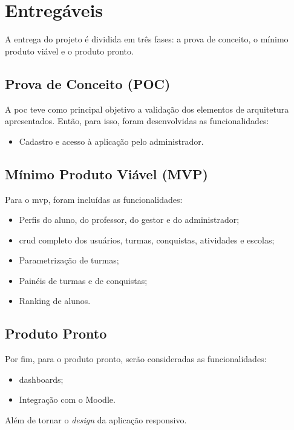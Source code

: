 \section{Entregáveis}
A entrega do projeto é dividida em três fases: a prova de conceito, o mínimo produto viável e o produto pronto.

\subsection{Prova de Conceito (POC)}
A \ac{poc} teve como principal objetivo a validação dos elementos de arquitetura apresentados. Então, para isso, foram desenvolvidas as funcionalidades:
 \begin{itemize}
     \item Cadastro e acesso à aplicação pelo administrador.
 \end{itemize}

\subsection{Mínimo Produto Viável (MVP)}
Para o \ac{mvp}, foram incluídas as funcionalidades:
\begin{itemize}
    \item Perfis do aluno, do professor, do gestor e do administrador;
    \item \ac{crud} completo dos usuários, turmas, conquistas, atividades e escolas;
    \item Parametrização de turmas;
    \item Painéis de turmas e de conquistas;
    \item Ranking de alunos.
\end{itemize}

\subsection{Produto Pronto}
Por fim, para o produto pronto, serão consideradas as funcionalidades:

\begin{itemize}
    \item \glspl{dashboard};
    \item Integração com o Moodle.
\end{itemize}

Além de tornar o \textit{design} da aplicação responsivo.